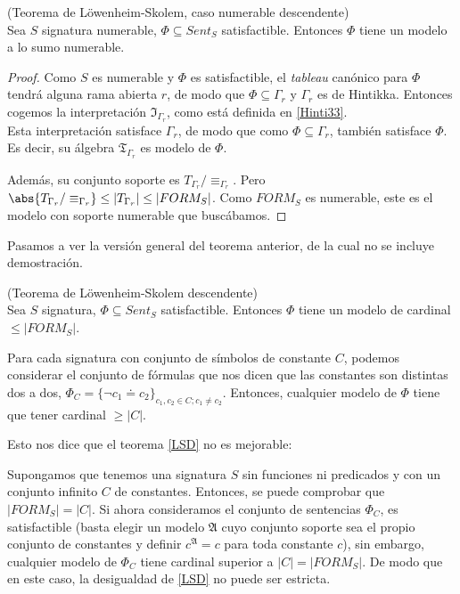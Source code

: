 \begin{theorem}
(Teorema de Löwenheim-Skolem, caso numerable descendente)\\
Sea $S$ signatura numerable, $\Phi\subseteq Sent_S$ satisfactible. Entonces $\Phi$ tiene un modelo a lo sumo numerable.
\end{theorem}
\begin{proof}
Como $S$ es numerable y $\Phi$ es satisfactible, el \textit{tableau} canónico para $\Phi$ tendrá alguna rama abierta $r$, de modo que $\Phi\subseteq\Gamma_r$ y $\Gamma_r$ es de Hintikka. Entonces cogemos la interpretación $\mathfrak{I}_{\Gamma_r}$, como está definida en \ref{Hinti33}.\\

Esta interpretación satisface $\Gamma_r$, de modo que como $\Phi\subseteq\Gamma_r$, también satisface $\Phi$. Es decir, su álgebra $\mathfrak{T}_{\Gamma_r}$ es modelo de $\Phi$.

Además, su conjunto soporte es $T_{\Gamma_r}/\equiv_{\Gamma_r}$. Pero $\abs{T_{\Gamma_r}/\equiv_{\Gamma_r}}\leq|T_{\Gamma_r}|\leq|FORM_S|$. Como $FORM_S$ es numerable, este es el modelo con soporte numerable que buscábamos.
\end{proof}

Pasamos a ver la versión general del teorema anterior, de la cual no se incluye demostración.

\begin{theorem}\label{LSD} (Teorema de Löwenheim-Skolem descendente)\\
Sea $S$ signatura, $\Phi\subseteq Sent_S$ satisfactible. Entonces $\Phi$ tiene un modelo de cardinal $\leq|FORM_S|$.
\end{theorem}

\begin{note}
Para cada signatura con conjunto de símbolos de constante $C$, podemos considerar el conjunto de fórmulas que nos dicen que las constantes son distintas dos a dos, $\Phi_C=\{\neg c_1\doteq c_2\}_{c_1,c_2\in C;c_1\neq c_2}$. Entonces, cualquier modelo de $\Phi$ tiene que tener cardinal $\geq |C|$.

Esto nos dice que el teorema \ref{LSD} no es mejorable:

Supongamos que tenemos una signatura $S$ sin funciones ni predicados y con un conjunto infinito $C$ de constantes. Entonces, se puede comprobar que $|FORM_S|=|C|$. Si ahora consideramos el conjunto de sentencias $\Phi_C$, es satisfactible (basta elegir un modelo $\mathfrak{A}$ cuyo conjunto  soporte sea el propio conjunto de constantes y definir $c^\mathfrak{A}=c$ para toda constante $c$), sin embargo, cualquier  modelo de $\Phi_C$ tiene cardinal superior a $|C|=|FORM_S|$. De modo que en este caso, la desigualdad de \ref{LSD} no puede  ser  estricta.
\end{note}


